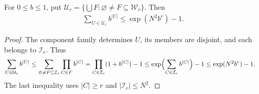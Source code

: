 \begin{lemma}
    \label{thm:cluster_label_window_weights}
    \leanok

    For $0\leq b\leq1$, put
    $\mathcal U_r=\{\bigcup F:\varnothing\ne F\subseteq\mathcal W_r\}$.
    Then
    \begin{align}
        \sum_{U\in\mathcal U_r}b^{|U|}
        \leq\exp(N^2b^r)-1.
        \label{eq:cluster_label_window_weights}
    \end{align}
\end{lemma}
\begin{proof}\leanok
    The component family determines $U$, its members are disjoint,
    and each belongs to $\mathcal I_r$. Thus
    \begin{align}
        \sum_{U\in\mathcal U_r}b^{|U|}
        &\leq\sum_{\varnothing\ne F\subseteq\mathcal I_r}
                   \prod_{C\in F}b^{|C|}
         =\prod_{C\in\mathcal I_r}(1+b^{|C|})-1
         \leq\exp\Bigl(\sum_{C\in\mathcal I_r}b^{|C|}\Bigr)-1
         \leq\exp(N^2b^r)-1.
        \label{eq:cluster_label_weight_product}
    \end{align}
    The last inequality uses $|C|\geq r$ and
    $|\mathcal I_r|\leq N^2$.
\end{proof}


